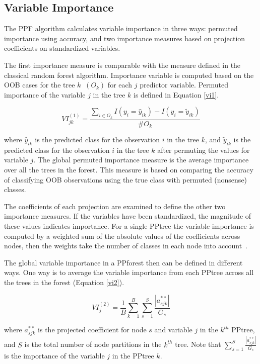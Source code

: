 \documentclass[smallextended,natbib]{svjour3}\usepackage[]{graphicx}\usepackage[]{xcolor}
\begin{document}
\subsection{Variable Importance}

The PPF algorithm calculates variable importance in three ways: permuted importance using accuracy,  and two importance measures based on projection coefficients on standardized variables.

The first importance measure is comparable with the measure defined in the classical random forest algorithm. Importance variable is computed based on the OOB cases for the tree $k\;\;(O_k)$ for each $j$ predictor variable.
Permuted importance of the variable $j$ in the tree $k$ is defined in Equation \ref{vi1}.

\begin{equation}
VI^{(1)} _{jk} = \frac{\sum_{i \in O_k } I(y_i=\hat y_{ik})-I(y_i=\tilde y_{ik})}{\# O_k}
\label{vi1}
\end{equation}

\noindent where $\hat y_{ik}$ is the predicted class for the observation $i$ in the tree $k$, and $\tilde y_{ik}$ is the predicted class for the observation $i$ in the tree $k$ after permuting the values for variable $j$. The global permuted importance measure is the average importance over all the trees in the forest. This measure is based on comparing the accuracy of classifying OOB observations using the true class with permuted (nonsense) classes.

The coefficients of each projection are examined to define the other two importance measures. If the variables have been standardized, the magnitude of these values indicates importance. For a single PPtree the variable importance is computed by a weighted sum of the absolute values of the coefficients across nodes, then the weights take the number of classes in each node into account~\citep{lee2013pptree}.

The global variable importance in a PPforest then can be defined in different ways. One way is to average the variable importance from each PPtree across all the trees in the forest (Equation \ref{vi2}).

\begin{equation}
VI^{(2)}_j=\frac{1}{B}\sum_{k=1}^B \sum_{s= 1}^{S}\frac{|a^{**}_{sjk}|}{G_s }
\label{vi2}
\end{equation}

\noindent where $a^{**}_{sjk}$ is the projected coefficient for node $s$ and variable $j$ in the $k^{th}$ PPtree, and $S$ is the total number of node partitions in the $k^{th}$ tree. Note that $\sum_{s= 1}^{S}\frac{|a^{**}_{sjk}|}{G_s }$ is the importance of the variable $j$ in the PPtree $k$. 
\end{document}
